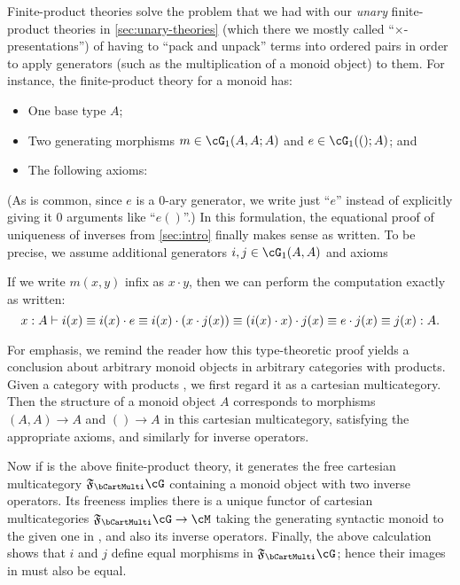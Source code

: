 Finite-product theories solve the problem that we had with our \emph{unary} finite-product theories in \cref{sec:unary-theories} (which there we mostly called ``$\times$-presentations'') of having to ``pack and unpack'' terms into ordered pairs in order to apply generators (such as the multiplication of a monoid object) to them.
For instance, the finite-product theory for a monoid has:
\begin{itemize}
\item One base type $A$;
\item Two generating morphisms $m\in\cG_1(A,A;A)$ and $e\in \cG_1(();A)$; and
\item The following axioms:
\end{itemize}
(As is common, since $e$ is a 0-ary generator, we write just ``$e$'' instead of explicitly giving it 0 arguments like ``$e()$''.)
In this formulation, the equational proof of uniqueness of inverses from \cref{sec:intro} finally makes sense as written.
To be precise, we assume additional generators $i,j\in \cG_1(A,A)$ and axioms
If we write $m(x,y)$ infix as $x\cdot y$, then we can perform the computation exactly as written:
\[ x:A \vdash i(x) \equiv i(x) \cdot e \equiv i(x) \cdot (x \cdot j(x)) \equiv (i(x)\cdot x)\cdot j(x) \equiv e\cdot j(x) \equiv j(x) : A.\]

For emphasis, we remind the reader how this type-theoretic proof yields a conclusion about arbitrary monoid objects in arbitrary categories with products.
Given a category with products \cM, we first regard it as a cartesian multicategory.
Then the structure of a monoid object $A$ corresponds to morphisms $(A,A)\to A$ and $()\to A$ in this cartesian multicategory, satisfying the appropriate axioms, and similarly for inverse operators.

Now if \cG is the above finite-product theory, it generates the free cartesian multicategory $\F\bCartMulti\cG$ containing a monoid object with two inverse operators.
Its freeness implies there is a unique functor of cartesian multicategories $\F\bCartMulti\cG\to \cM$ taking the generating syntactic monoid to the given one in \cM, and also its inverse operators.
Finally, the above calculation shows that $i$ and $j$ define equal morphisms in $\F\bCartMulti\cG$; hence their images in \cM must also be equal.

